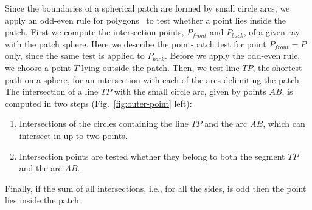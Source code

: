 Since the boundaries of a spherical patch are formed by small circle arcs, we apply an odd-even rule for polygons~\cite{shimrat1962algorithm} to test whether a point lies inside the patch. 
First we compute the intersection points, $P_{front}$ and $P_{back}$, of a given ray with the patch sphere.
Here we describe the point-patch test for point $P_{front}=P$ only, since the same test is applied to $P_{back}$.
Before we apply the odd-even rule, we choose a point $T$ lying outside the patch.
Then, we test line $TP$, the shortest path on a sphere, for an intersection with each of the arcs delimiting the patch.
The intersection of a line $TP$ with the small circle arc, given by points $AB$, is computed in two steps (Fig.~\ref{fig:outer-point} left):
\begin{enumerate}
  \item Intersections of the circles containing the line $TP$ and the arc $AB$, which can intersect in up to two points.
  \item Intersection points are tested whether they belong to both the segment $TP$ and the arc $AB$.
\end{enumerate}
Finally, if the sum of all intersections, i.e., for all the sides, is odd then the point lies inside the patch.

